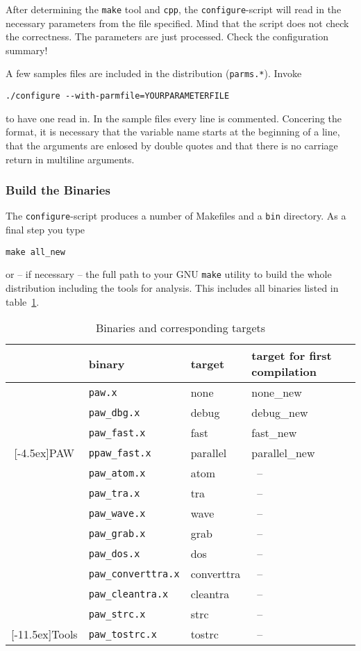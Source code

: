 \documentclass[a4paper,10pt]{article}
\newcommand{\PAW}{\textsc{PAW}}
\begin{document}
After determining the \texttt{make} tool and \texttt{cpp}, the
\texttt{configure}-script will read in the necessary parameters from the file
specified. Mind that the script does not check the correctness. The parameters are just processed. Check the configuration summary!

A few samples files are included in the distribution (\texttt{parms.*}).  Invoke 
\begin{verbatim}
./configure --with-parmfile=YOURPARAMETERFILE
\end{verbatim}
to have one read in.  In the sample files every line is commented. Concering
the format, it is necessary that the variable name starts at the beginning of a
line, that the arguments are enlosed by double quotes and that there is no carriage return in multiline arguments.


\subsubsection*{Build the Binaries}
The \texttt{configure}-script produces a number of Makefiles and a \texttt{bin}
directory.  As a final step you type
\begin{verbatim}
make all_new
\end{verbatim}
or -- if necessary -- the full path to your GNU \texttt{make} utility to build
the whole distribution including the tools for analysis. This includes all
binaries listed in table~\ref{tab:bins}.

\begin{table}[h]
\centering
\begin{tabular}{|c|l|l|l|} \hline
          & binary       & target & target for first compilation \\ \hline \hline
          & {\tt paw.x}        & none   & none\_new \\
          & {\tt paw\_dbg.x}    & debug  & debug\_new \\
          & {\tt paw\_fast.x}   & fast   & fast\_new \\
\raisebox{4.5ex}[-4.5ex]{\PAW}  & {\tt ppaw\_fast.x}  & parallel & parallel\_new \\ \hline
          & {\tt paw\_atom.x}  & atom & \ --  \\
          & {\tt paw\_tra.x}   & tra  & \ -- \\
          & {\tt paw\_wave.x}  & wave & \ -- \\
          & {\tt paw\_grab.x}  & grab & \ -- \\
          & {\tt paw\_dos.x}  & dos & \ -- \\
          & {\tt paw\_converttra.x} & converttra & \ -- \\
          & {\tt paw\_cleantra.x }  & cleantra   & \ -- \\
          & {\tt paw\_strc.x}       & strc       & \ -- \\
\raisebox{11.5ex}[-11.5ex]{Tools}  & {\tt paw\_tostrc.x}     & tostrc     & \ -- \\ \hline
\end{tabular}
\caption{Binaries and corresponding targets}
\label{tab:bins}
\end{table}
\end{document}

